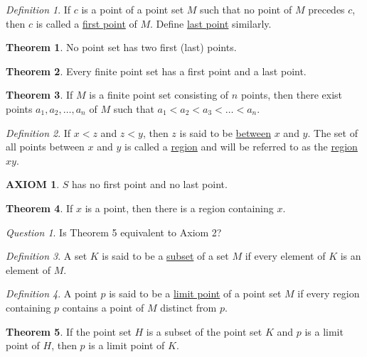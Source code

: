 \documentclass[12pt, oneside, letter] {amsart}
\theoremstyle {definition}
\newtheorem {thm} {Theorem}
\newtheorem {ax} {AXIOM}
\theoremstyle {remark}
\newtheorem* {defn} {Definition}
\newtheorem* {qn} {Question}
\begin{document}
\begin{defn}
  If $c$ is a point of a point set $M$ such that no point of $M$
  precedes $c$, then $c$ is called a \underline {first point} of $M$.
  Define \underline {last point} similarly.
\end{defn}

\begin{thm}
  No point set has two first (last) points.
\end{thm}

\begin{thm}
  Every finite point set has a first point and a last point.
\end{thm}

\begin{thm}
  If $M$ is a finite point set consisting of $n$ points, then there
  exist points $a_1, a_2, \dots, a_n$ of $M$ such that $a_1 < a_2 <
  a_3 < \dots < a_n$.
\end{thm}

\begin{defn}
  If $x < z$ and $z < y$, then $z$ is said to be \underline {between}
  $x$ and $y$. The set of all points between $x$ and $y$ is called a
  \underline {region} and will be referred to as the \underline
  {region} $xy$.
\end{defn}

\begin{ax}
  $S$ has no first point and no last point.
\end{ax}

\begin{thm}
  If $x$ is a point, then there is a region containing $x$.
\end{thm}

\begin{qn}
  Is Theorem 5 equivalent to Axiom 2?
\end{qn}

\begin{defn}
  A set $K$ is said to be a \underline {subset} of a set $M$ if every
  element of $K$ is an element of $M$.
\end{defn}

\begin{defn}
  A point $p$ is said to be a \underline {limit point} of a point set
  $M$ if every region containing $p$ contains a point of $M$ distinct
  from $p$.
\end{defn}

\begin{thm}
  If the point set $H$ is a subset of the point set $K$ and $p$ is a
  limit point of $H$, then $p$ is a limit point of $K$.
\end{thm}
\end{document}
